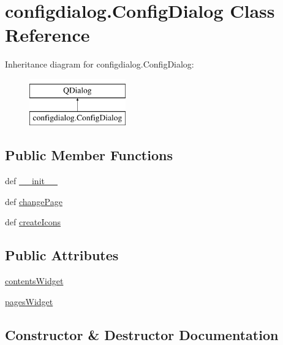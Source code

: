 \hypertarget{classconfigdialog_1_1ConfigDialog}{}\section{configdialog.\+Config\+Dialog Class Reference}
\label{classconfigdialog_1_1ConfigDialog}
Inheritance diagram for configdialog.\+Config\+Dialog\+:\begin{figure}[H]
\begin{center}
\leavevmode
\includegraphics[height=2.000000cm]{classconfigdialog_1_1ConfigDialog}
\end{center}
\end{figure}
\subsection*{Public Member Functions}
\begin{DoxyCompactItemize}
\item 
def \hyperlink{classconfigdialog_1_1ConfigDialog_a9cf69d752d4c50fe3d3b0b0b0c83c7c3}{\+\_\+\+\_\+init\+\_\+\+\_\+}
\item 
def \hyperlink{classconfigdialog_1_1ConfigDialog_aa08c11eb02ab8f93ccfcb47d42aaee98}{change\+Page}
\item 
def \hyperlink{classconfigdialog_1_1ConfigDialog_a391b01f05cc0569e6a75441e6535bb85}{create\+Icons}
\end{DoxyCompactItemize}
\subsection*{Public Attributes}
\begin{DoxyCompactItemize}
\item 
\hyperlink{classconfigdialog_1_1ConfigDialog_a32b868578d2b6954f894bd13976c6652}{contents\+Widget}
\item 
\hyperlink{classconfigdialog_1_1ConfigDialog_aecd579b669260d53fdd59ccae7f0044e}{pages\+Widget}
\end{DoxyCompactItemize}


\subsection{Constructor \& Destructor Documentation}
\hypertarget{classconfigdialog_1_1ConfigDialog_a9cf69d752d4c50fe3d3b0b0b0c83c7c3}{}
